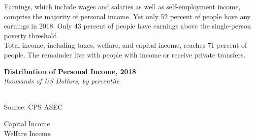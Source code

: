 \documentclass{report}
\newcommand{\tbllink}[1]{\href{https://raw.githubusercontent.com/bdecon/US-chartbook/master/chartbook/data/#1}{\faTable}}
\begin{document}
{{\begin{minipage}{0.76\textwidth}
\end{minipage}

\newpage

\begin{minipage}{0.76\textwidth}

\small Earnings, which include wages and salaries as well as self-employment income, comprise the majority of personal income. Yet only 52 percent of people have any earnings in 2018. Only 43 percent of people have earnings above the single-person poverty threshold.\\

Total income, including taxes, welfare, and capital income, reaches 71 percent of people. The remainder live with people with income or receive private transfers. \\

\vspace{2mm}

\noindent \normalsize \textbf{Distribution of Personal Income, 2018}\\
\footnotesize{\textit{thousands of US Dollars, by percentile}}\\
\noindent {}\\
\footnotesize{Source: CPS ASEC} \hspace{80mm} \tbllink{pearn_dist.csv}\\

\vspace{6mm}

\normalsize

Capital Income \\

Welfare Income \\

\vspace{2mm}


\end{minipage}}}
\end{document}
